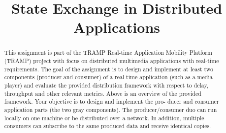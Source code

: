 \documentclass{acm_proc_article-sp}
\begin{document}
\title{State Exchange in Distributed Applications}

%
%
%
%
%

%
\author{}


\maketitle
\begin{abstract}
This assignment is part of the TRAMP Real-time Application Mobility Platform (TRAMP) project with focus on distributed multimedia applications with real-time requirements.
The goal of the assignment is to design and implement at least two components (producer and consumer) of a real-time application (such as a media player) and evaluate the provided distribution framework with respect to delay, throughput and other relevant metrics. Above is an overview of the provided framework. Your objective is to design and implement the pro- ducer and consumer application parts (the two gray components). The producer/consumer duo can run locally on one machine or be distributed over a network. In addition, multiple consumers can subscribe to the same produced data and receive identical copies.
\end{abstract}
\end{document}
